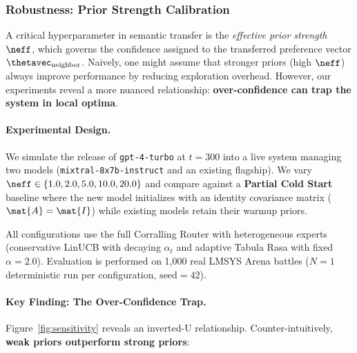 
\subsubsection{Robustness: Prior Strength Calibration}

A critical hyperparameter in semantic transfer is the \textit{effective prior strength} $\neff$, which governs the confidence assigned to the transferred preference vector $\thetavec_{\text{neighbor}}$. Naively, one might assume that stronger priors (high $\neff$) always improve performance by reducing exploration overhead. However, our experiments reveal a more nuanced relationship: \textbf{over-confidence can trap the system in local optima}.

\paragraph{Experimental Design.}
We simulate the release of \texttt{gpt-4-turbo} at $t=300$ into a live system managing two models (\texttt{mixtral-8x7b-instruct} and an existing flagship). We vary $\neff \in \{1.0, 2.0, 5.0, 10.0, 20.0\}$ and compare against a \textbf{Partial Cold Start} baseline where the new model initializes with an identity covariance matrix ($\mat{A} = \mat{I}$) while existing models retain their warmup priors.

All configurations use the full Corralling Router with heterogeneous experts (conservative LinUCB with decaying $\alpha_{t}$ and adaptive Tabula Rasa with fixed $\alpha=2.0$). Evaluation is performed on 1,000 real LMSYS Arena battles ($N=1$ deterministic run per configuration, $\text{seed}=42$).

\paragraph{Key Finding: The Over-Confidence Trap.}
Figure~\ref{fig:sensitivity} reveals an inverted-U relationship. Counter-intuitively, \textbf{weak priors outperform strong priors}:

